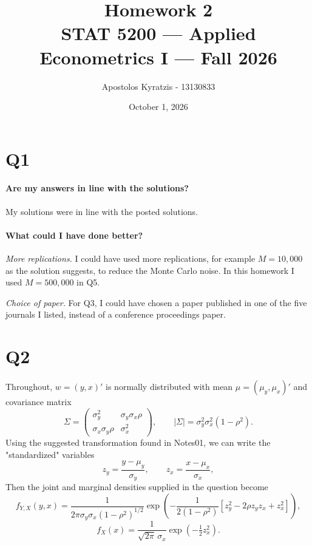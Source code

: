\documentclass[11pt]{article}
\title{\vspace{-2em}Homework 2\\[0.3em]
       \large STAT 5200 --- Applied Econometrics I --- Fall 2026}
\author{Apostolos Kyratzis - 13130833}
\date{October 1, 2026}
\begin{document}
\maketitle

\section{Q1}

\paragraph{Are my answers in line with the solutions?}
My solutions were in line with the posted solutions.

\paragraph{What could I have done better?}

\emph{More replications.} I could have used more replications, for example
$M = 10{,}000$ as the solution suggests, to reduce the Monte Carlo noise. In
this homework I used $M = 500{,}000$ in Q5.

\emph{Choice of paper.} For Q3, I could have chosen a paper published in one of
the five journals I listed, instead of a conference proceedings paper.

\section{Q2}
\label{sec:q2}

Throughout, $w = (y,x)'$ is normally distributed with mean $\mu = (\mu_y,
\mu_x)'$ and covariance matrix
\[
\Sigma =
\begin{pmatrix}
\sigma_y^2 & \sigma_y\sigma_x\rho\\
\sigma_x\sigma_y\rho & \sigma_x^2
\end{pmatrix},
\qquad
|\Sigma| = \sigma_y^2\sigma_x^2(1-\rho^2).
\]
Using the suggested transformation found in Notes01, we can write the "standardized" variables
\[
z_y = \frac{y-\mu_y}{\sigma_y},
\qquad
z_x = \frac{x-\mu_x}{\sigma_x},
\]
Then the joint and marginal densities supplied in the question become
\[
f_{Y,X}(y,x) = \frac{1}{2\pi\sigma_y\sigma_x(1-\rho^2)^{1/2}}
  \exp\!\left(-\frac{1}{2(1-\rho^2)}
  \left[z_y^2 - 2\rho z_y z_x + z_x^2\right]\right),
\]
\[
f_X(x) = \frac{1}{\sqrt{2\pi}\,\sigma_x}
  \exp\!\left(-\tfrac{1}{2}z_x^2\right).
\]
\end{document}
